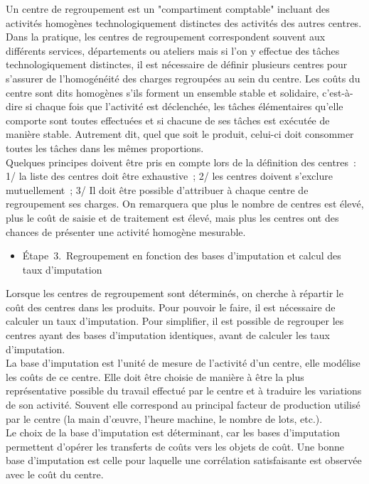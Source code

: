 \documentclass{kaobook}
\begin{document}
Un centre de regroupement est un "compartiment comptable" incluant des activités homogènes technologiquement distinctes des activités des autres centres. Dans la pratique, les centres de regroupement correspondent souvent aux différents services, départements ou ateliers mais si l'on y effectue des tâches technologiquement distinctes, il est nécessaire de définir plusieurs centres pour s'assurer de l'homogénéité des charges regroupées au sein du centre. Les coûts du centre sont dits homogènes s'ils forment un ensemble stable et solidaire, c'est-à-dire si chaque fois que l'activité est déclenchée, les tâches élémentaires qu'elle comporte sont toutes effectuées et si chacune de ses tâches est exécutée de manière stable. Autrement dit, quel que soit le produit, celui-ci doit consommer toutes les tâches dans les mêmes proportions.\\
Quelques principes doivent être pris en compte lors de la définition des centres : 1/ la liste des centres doit être exhaustive ; 2/ les centres doivent s'exclure mutuellement ; 3/ Il doit être possible d'attribuer à chaque centre de regroupement ses charges. On remarquera que plus le nombre de centres est élevé, plus le coût de saisie et de traitement est élevé, mais plus les centres ont des chances de présenter une activité homogène mesurable.\\
\begin{itemize}
\item Étape 3. Regroupement en fonction des bases d’imputation et calcul des taux d’imputation\\
\end{itemize}
Lorsque les centres de regroupement sont déterminés, on cherche à répartir le coût des centres dans les produits. Pour pouvoir le faire, il est nécessaire de calculer un taux d'imputation. Pour simplifier, il est possible de regrouper les centres ayant des bases d'imputation identiques, avant de calculer les taux d'imputation.\\
La base d'imputation est l'unité de mesure de l'activité d'un centre, elle modélise les coûts de ce centre. Elle doit être choisie de manière à être la plus représentative possible du travail effectué par le centre et à traduire les variations de son activité. Souvent elle correspond au principal facteur de production utilisé par le centre (la main d'œuvre, l'heure machine, le nombre de lots, etc.).\\
Le choix de la base d'imputation est déterminant, car les bases d'imputation permettent d'opérer les transferts de coûts vers les objets de coût. Une bonne base d'imputation est celle pour laquelle une corrélation satisfaisante est observée avec le coût du centre.\\
\end{document}
